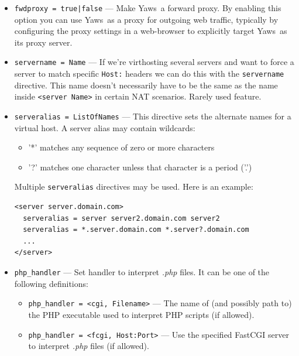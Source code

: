 \documentclass[11pt,oneside,english]{book}
\newcommand{\Yaws}            %
        {{\sc Yaws}}
\begin{document}
\begin{itemize}
\item       \verb+fwdproxy = true|false+ ---
              Make \Yaws\ a forward proxy. By enabling this option you can use
              \Yaws\ as a proxy for outgoing web traffic, typically by
              configuring the proxy settings in a web-browser to explicitly
              target \Yaws\ as its proxy server.

\item       \verb+servername = Name+ ---
              If we're virthosting several servers and want to force a server to
              match specific \verb+Host:+ headers we can do this with the \verb+servername+
              directive. This name doesn't necessarily have to be the same as
              the name inside \verb+<server Name>+ in certain NAT scenarios. Rarely
              used feature.

\item       \verb+serveralias = ListOfNames+ ---
              This directive sets the alternate names for a virtual host. A
              server alias may contain wildcards:
              \begin{itemize}
                \item '*' matches any sequence of zero or more characters
                \item '?' matches one character unless that character is a
                  period ('.')
              \end{itemize}
              Multiple \verb+serveralias+ directives may be used. Here is an
              example:
\begin{verbatim}
<server server.domain.com>
  serveralias = server server2.domain.com server2
  serveralias = *.server.domain.com *.server?.domain.com
  ...
</server>
\end{verbatim}

\item       \verb+php_handler+ ---
              Set handler to interpret \textit{.php} files. It can be
              one of the following definitions:

              \begin{itemize}
              \item \verb+php_handler = <cgi, Filename>+ --- The name
                of (and possibly path to) the PHP executable used to
                interpret PHP scripts (if allowed).
              \item \verb+php_handler = <fcgi, Host:Port>+ --- Use the
                specified FastCGI server to interpret \textit{.php}
                files (if allowed).


\end{itemize}
\end{itemize}
\end{document}
